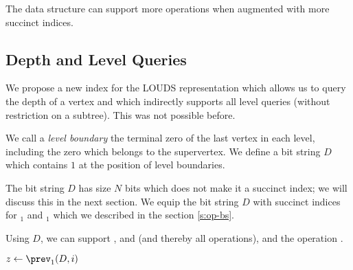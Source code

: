 \begin{algorithm}
\begin{algorithmic}
	\State {}
\EndFunction
\end{algorithmic}
\end{algorithm}

\begin{algorithm}
\begin{algorithmic}
 
	\State {}
\EndFunction
\end{algorithmic}
\end{algorithm}

\bigbreak

The data structure can support more operations when augmented with more succinct indices.

\subsection{Depth and Level Queries}

We propose a new index for the LOUDS representation which allows us to query the depth of a vertex and which indirectly supports all level queries (without restriction on a subtree).
This was not possible before.

We call a \emph{level boundary} the terminal zero of the last vertex in each level, including the zero which belongs to the supervertex.
We define a bit string $D$ which contains $1$ at the position of level boundaries.

The bit string $D$ has size $N$ bits which does not make it a succinct index; we will discuss this in the next section.
We equip the bit string $D$ with succinct indices for \rank$_1$ and \select$_1$ which we described in the section \ref{s:op-bs}.

Using $D$, we can support \levelRank{}, \levelSelect{} and \levelSize{} (and thereby all \levelAny{} operations), and the operation \dep{}.

\begin{algorithm}
\begin{algorithmic}
	\State $z \gets \prev_1(D, i)$ 
	\State {}
\EndFunction
\end{algorithmic}
\end{algorithm}

